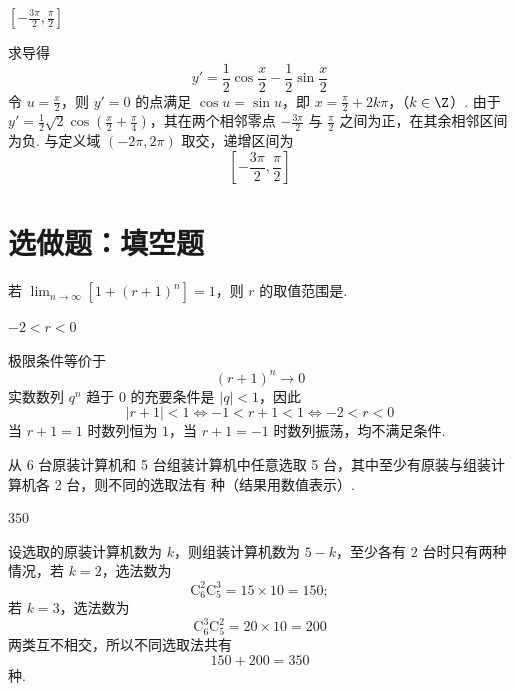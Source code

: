 \begin{answer}
\(\left[-\frac{3\pi}{2},\frac{\pi}{2}\right]\)
\end{answer}

\begin{solution}
求导得
\[
y'=\frac12\cos\frac{x}{2}-\frac12\sin\frac{x}{2}
\]
令 \(u=\frac{x}{2}\)，则 \(y'=0\) 的点满足 \(\cos u=\sin u\)，即
\(x=\frac{\pi}{2}+2k\pi\)，（\(k\in\Z\)）.
由于 \(y'=\frac12\sqrt2\cos\left(\frac{x}{2}+\frac{\pi}{4}\right)\)，其在两个相邻零点 \(-\frac{3\pi}{2}\) 与 \(\frac{\pi}{2}\) 之间为正，在其余相邻区间为负. 与定义域 \((-2\pi,2\pi)\) 取交，递增区间为
\[
\left[-\frac{3\pi}{2},\frac{\pi}{2}\right]
\]
\end{solution}

\section{选做题：填空题}

\begin{problem}[A]
若 \(\displaystyle\lim_{n\to\infty}\left[1+(r+1)^n\right]=1\)，则 \(r\) 的取值范围是\fillinblank{}.
\end{problem}

\begin{answer}
\(-2<r<0\)
\end{answer}

\begin{solution}
极限条件等价于
\[
(r+1)^n\longrightarrow0
\]
实数数列 \(q^n\) 趋于 \(0\) 的充要条件是 \(|q|<1\)，因此
\[
|r+1|<1
\iff -1<r+1<1
\iff -2<r<0
\]
当 \(r+1=1\) 时数列恒为 \(1\)，当 \(r+1=-1\) 时数列振荡，均不满足条件.
\end{solution}

\begin{problem}[A]
从 6 台原装计算机和 5 台组装计算机中任意选取 5 台，其中至少有原装与组装计算机各 2 台，则不同的选取法有\fillinblank{} 种（结果用数值表示）.
\end{problem}

\begin{answer}
\(350\)
\end{answer}

\begin{solution}
设选取的原装计算机数为 \(k\)，则组装计算机数为 \(5-k\)，至少各有 \(2\) 台时只有两种情况，若 \(k=2\)，选法数为
\[
\mathrm C_6^2\mathrm C_5^3=15\times10=150;
\]
若 \(k=3\)，选法数为
\[
\mathrm C_6^3\mathrm C_5^2=20\times10=200
\]
两类互不相交，所以不同选取法共有
\[
150+200=350
\]
种.
\end{solution}

